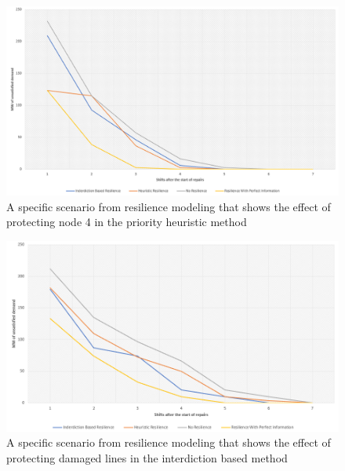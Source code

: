 \begin{figure}[htbp]
	\centering
	\includegraphics[width=.9\linewidth]{Heuristic24Scenario.png}
	\caption{A specific scenario from resilience modeling that shows the effect of protecting node 4 in the priority heuristic method}
\end{figure}
\begin{figure}[htbp]
	\centering
	\includegraphics[width=.9\linewidth]{Inderdiction24Scenario.png}
	\caption{A specific scenario from resilience modeling that shows the effect of protecting damaged lines in the interdiction based method}
\end{figure}

